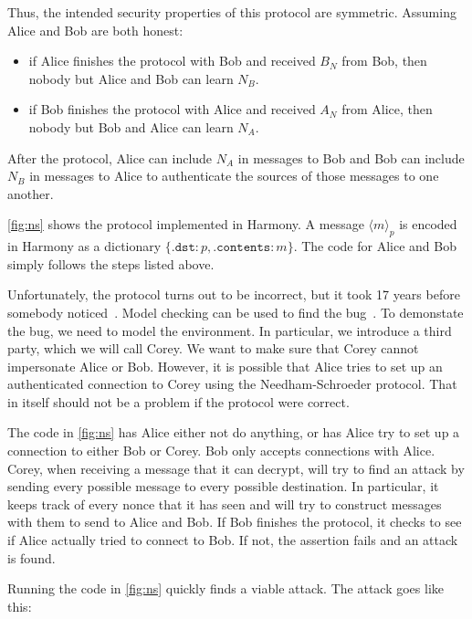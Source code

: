 \documentclass{report}
\begin{document}
Thus, the intended security properties of this protocol are symmetric.
Assuming Alice and Bob are both honest:
\begin{itemize}
\item if Alice finishes the protocol with Bob and received $B_N$ from Bob, then
nobody but Alice and Bob can learn $N_B$.
\item if Bob finishes the protocol with Alice and received $A_N$ from Alice, then
nobody but Bob and Alice can learn $N_A$.
\end{itemize}

After the protocol, Alice can include $N_A$ in messages to Bob and Bob can
include $N_B$ in messages to Alice to authenticate the sources of those messages
to one another.

\autoref{fig:ns} shows the protocol implemented in Harmony.
A message $\langle m \rangle_p$ is encoded in Harmony as a dictionary
$\{ \mathtt{.dst}: p, \mathtt{.contents}: m \}$.  The code for Alice and Bob
simply follows the steps listed above.

Unfortunately, the protocol turns out to be incorrect, but it took 17 years before
somebody noticed~\cite{Lowe95}.  Model checking can be used to find the bug~\cite{Lowe96}.
To demonstate the bug, we need to model the environment.
In particular, we introduce a third party, which we will call Corey.
We want to make sure that Corey cannot impersonate Alice or Bob.
However, it is possible that Alice tries to set up an authenticated connection to Corey
using the Needham-Schroeder protocol.  That in itself should not be a problem if the
protocol were correct.

The code in \autoref{fig:ns} has Alice either not do anything, or has Alice try to set
up a connection to either Bob
or Corey.  Bob only accepts connections with Alice.  Corey, when receiving a message
that it can decrypt, will try to find an attack by sending every possible message to
every possible destination.  In particular, it keeps track of every nonce that it has
seen and will try to construct messages with them to send to Alice and Bob.
If Bob finishes the protocol, it checks to see if Alice actually tried to connect
to Bob.  If not, the assertion fails and an attack is found.

Running the code in \autoref{fig:ns} quickly finds a viable attack.  The attack goes
like this:
\end{document}

